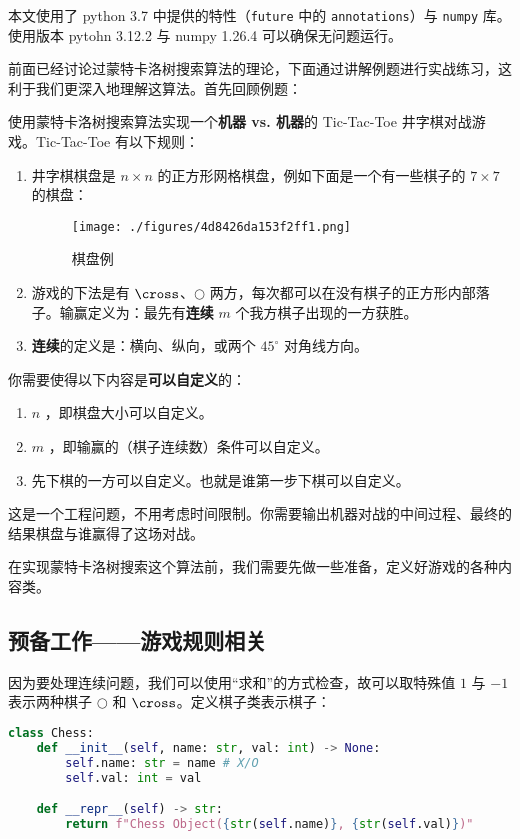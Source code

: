 

本文使用了 python 3.7 中提供的特性（\verb`future` 中的 \verb`annotations`）与 \verb`numpy` 库。使用版本 pytohn 3.12.2 与 numpy 1.26.4 可以确保无问题运行。

前面已经讨论过蒙特卡洛树搜索算法的理论，下面通过讲解例题进行实战练习，这利于我们更深入地理解这算法。首先回顾例题：
\begin{example}{}
使用蒙特卡洛树搜索算法实现一个\textbf{机器 vs. 机器}的 Tic-Tac-Toe 井字棋对战游戏。Tic-Tac-Toe 有以下规则：
\begin{enumerate}
\item 井字棋棋盘是 $n \times n$ 的正方形网格棋盘，例如下面是一个有一些棋子的 $7 \times 7$ 的棋盘：
\begin{figure}[ht]
\centering
\texttt{[image: ./figures/4d8426da153f2ff1.png]}
\caption{棋盘例} \label{fig_MCTSci_2}
\end{figure}
\item 游戏的下法是有 $\cross$、$\bigcirc$ 两方，每次都可以在没有棋子的正方形内部落子。输赢定义为：最先有\textbf{连续} $m$ 个我方棋子出现的一方获胜。
\item \textbf{连续}的定义是：横向、纵向，或两个 $45^\circ$ 对角线方向。
\end{enumerate}

你需要使得以下内容是\textbf{可以自定义}的：
\begin{enumerate}
\item $n$ ，即棋盘大小可以自定义。
\item $m$ ，即输赢的（棋子连续数）条件可以自定义。
\item 先下棋的一方可以自定义。也就是谁第一步下棋可以自定义。
\end{enumerate}

这是一个工程问题，不用考虑时间限制。你需要输出机器对战的中间过程、最终的结果棋盘与谁赢得了这场对战。
\end{example}
在实现蒙特卡洛树搜索这个算法前，我们需要先做一些准备，定义好游戏的各种内容类。
\subsection{预备工作——游戏规则相关}
因为要处理连续问题，我们可以使用“求和”的方式检查，故可以取特殊值 $1$ 与 $-1$ 表示两种棋子 $\bigcirc$ 和 $\cross$。定义棋子类表示棋子：
\begin{lstlisting}[language=python]
class Chess:
    def __init__(self, name: str, val: int) -> None:
        self.name: str = name # X/O
        self.val: int = val

    def __repr__(self) -> str:
        return f"Chess Object({str(self.name)}, {str(self.val)})"
\end{lstlisting}

